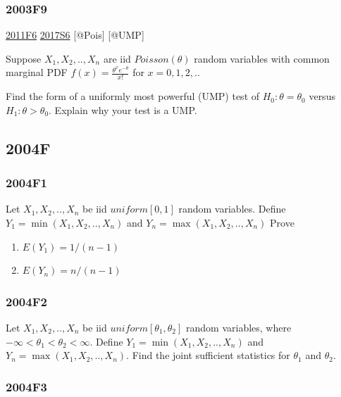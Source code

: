 \documentclass[6pt,Portrait]{article}
\begin{document}
\hypertarget{f9-1}{%
\subsubsection{2003F9}\label{f9-1}}

\protect\hyperlink{f6-4}{2011F6} \protect\hyperlink{s6-4}{2017S6}
{[}@Pois{]} {[}@UMP{]}

Suppose \(X_1,X_2,..,X_n\) are iid \(Poisson(\theta)\) random variables
with common marginal PDF \(f(x)=\frac{\theta^xe^{-\theta}}{x!}\) for
\(x = 0,1,2,..\)

Find the form of a uniformly most powerful (UMP) test of
\(H_0:\theta=\theta_0\) versus \(H_1:\theta>\theta_0\). Explain why your
test is a UMP.

\hypertarget{f-2}{%
\subsection{2004F}\label{f-2}}

\hypertarget{f1-2}{%
\subsubsection{2004F1}\label{f1-2}}

Let \(X_1,X_2,..,X_n\) be iid \(uniform[0,1]\) random variables. Define
\(Y_1=\min(X_1,X_2,..,X_n)\) and \(Y_n=\max(X_1,X_2,..,X_n)\) Prove

\begin{enumerate}
\def\labelenumi{(\alph{enumi})}
\item
  \(E(Y_1) =1/(n-1)\)
\item
  \(E(Y_n) =n/(n-1)\)
\end{enumerate}

\hypertarget{f2-2}{%
\subsubsection{2004F2}\label{f2-2}}

Let \(X_1,X_2,..,X_n\) be iid \(uniform[\theta_1,\theta_2]\) random
variables, where \(-\infty<\theta_1<\theta_2<\infty\). Define
\(Y_1=\min(X_1,X_2,..,X_n)\) and \(Y_n=\max(X_1,X_2,..,X_n)\). Find the
joint sufficient statistics for \(\theta_1\) and \(\theta_2\).

\hypertarget{f3-2}{%
\subsubsection{2004F3}\label{f3-2}}
\end{document}
